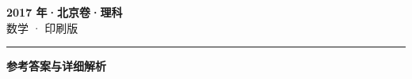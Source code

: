 \documentclass[zihao=5, a4paper]{ctexart}
\begin{document}
\begin{center}
  {\Large\bfseries 2017 年·北京卷·理科}\\[4pt]
  {\large 数学 · 印刷版}
\end{center}
\medskip
{}

\par\bigskip\hrule\bigskip
{}
\begin{center}{\large\bfseries 参考答案与详细解析}\end{center}
\smallskip

\end{document}
